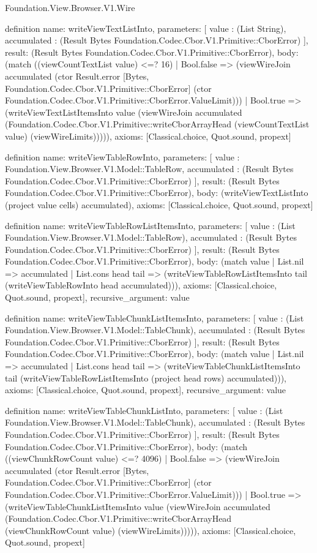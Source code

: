 \begin{lexlean}{Foundation.View.Browser.V1.Wire}
\begin{semanticmodule}
definition{
  name: writeViewTextListInto,
  parameters: [
    value : (List String),
    accumulated : (Result Bytes Foundation.Codec.Cbor.V1.Primitive::CborError)
  ],
  result: (Result Bytes Foundation.Codec.Cbor.V1.Primitive::CborError),
  body: (match ((viewCountTextList value) <=? 16)
    | Bool.false => (viewWireJoin accumulated (ctor Result.error [Bytes, Foundation.Codec.Cbor.V1.Primitive::CborError] (ctor Foundation.Codec.Cbor.V1.Primitive::CborError.ValueLimit)))
    | Bool.true => (writeViewTextListItemsInto value (viewWireJoin accumulated (Foundation.Codec.Cbor.V1.Primitive::writeCborArrayHead (viewCountTextList value) (viewWireLimits))))),
  axioms: [Classical.choice, Quot.sound, propext]
}

definition{
  name: writeViewTableRowInto,
  parameters: [
    value : Foundation.View.Browser.V1.Model::TableRow,
    accumulated : (Result Bytes Foundation.Codec.Cbor.V1.Primitive::CborError)
  ],
  result: (Result Bytes Foundation.Codec.Cbor.V1.Primitive::CborError),
  body: (writeViewTextListInto (project value cells) accumulated),
  axioms: [Classical.choice, Quot.sound, propext]
}

definition{
  name: writeViewTableRowListItemsInto,
  parameters: [
    value : (List Foundation.View.Browser.V1.Model::TableRow),
    accumulated : (Result Bytes Foundation.Codec.Cbor.V1.Primitive::CborError)
  ],
  result: (Result Bytes Foundation.Codec.Cbor.V1.Primitive::CborError),
  body: (match value
    | List.nil => accumulated
    | List.cons head tail => (writeViewTableRowListItemsInto tail (writeViewTableRowInto head accumulated))),
  axioms: [Classical.choice, Quot.sound, propext],
  recursive_argument: value
}

definition{
  name: writeViewTableChunkListItemsInto,
  parameters: [
    value : (List Foundation.View.Browser.V1.Model::TableChunk),
    accumulated : (Result Bytes Foundation.Codec.Cbor.V1.Primitive::CborError)
  ],
  result: (Result Bytes Foundation.Codec.Cbor.V1.Primitive::CborError),
  body: (match value
    | List.nil => accumulated
    | List.cons head tail => (writeViewTableChunkListItemsInto tail (writeViewTableRowListItemsInto (project head rows) accumulated))),
  axioms: [Classical.choice, Quot.sound, propext],
  recursive_argument: value
}

definition{
  name: writeViewTableChunkListInto,
  parameters: [
    value : (List Foundation.View.Browser.V1.Model::TableChunk),
    accumulated : (Result Bytes Foundation.Codec.Cbor.V1.Primitive::CborError)
  ],
  result: (Result Bytes Foundation.Codec.Cbor.V1.Primitive::CborError),
  body: (match ((viewChunkRowCount value) <=? 4096)
    | Bool.false => (viewWireJoin accumulated (ctor Result.error [Bytes, Foundation.Codec.Cbor.V1.Primitive::CborError] (ctor Foundation.Codec.Cbor.V1.Primitive::CborError.ValueLimit)))
    | Bool.true => (writeViewTableChunkListItemsInto value (viewWireJoin accumulated (Foundation.Codec.Cbor.V1.Primitive::writeCborArrayHead (viewChunkRowCount value) (viewWireLimits))))),
  axioms: [Classical.choice, Quot.sound, propext]
}


\end{semanticmodule}
\end{lexlean}
